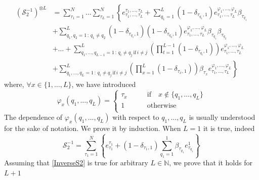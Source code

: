 \documentclass[11pt]{article}
\numberwithin{equation}{section}
\numberwithin{equation}{subsection}
\begin{document}
    \begin{equation}\label{InverseS2}
    	\begin{split}
    		\left(\mathcal{S}_{2}^{-1}\right)^{\otimes L}&=\sum_{\tau_{1}=1}^{N}\ldots\sum_{\tau_{L}=1}^{N}\left\{e_{\tau_{1},\ldots,\tau_{L}}^{\tau_{1},\ldots,\tau_{L}}+\sum_{q_{1}=1}^{L}(1-\delta_{\tau_{q_{1}},1})e_{\tau_{1},\ldots,\tau_{L}}^{\varphi_{1},\ldots,\varphi_{L}}\beta_{\tau_{q_{1}}}\right. 
    		\\&+\left. \sum_{q_{1},q_{2}=1\,:\,q_{1}\neq q_{2}}^{L}(1-\delta_{\tau_{q_{1}},1})(1-\delta_{\tau_{q_{2}},1})e^{\varphi_{1},\ldots,\varphi_{L}}_{\tau_{1},\ldots,\tau_{L}}\beta_{\tau_{q_{1}}}\beta_{\tau_{q_{2}}}\right.
    		\\&+\left.
    		\ldots+	\sum_{q_{1},\ldots,q_{L-1}=1\,:\,q_{i}\neq q_{j}\,\text{if}\,i\neq j}^{L}\left(\prod_{t=1}^{L-1}(1-\delta_{\tau_{q_{t}},1})\right)e_{\tau_{1},\ldots,\tau_{L}}^{\varphi_{1},\ldots,\varphi_{L}}
    		\right. \\&+ \left. 
    		\sum_{q_{1},\ldots,q_{L}=1\,:\,q_{i}\neq q_{j}\,\text{if}\,i\neq j}^{L}\left(\prod_{x=1}^{L}(1-\delta_{\tau_{x},1})\right)\beta_{\tau_{x}}e_{\tau_{1},\ldots,\tau_{L}}^{\varphi_{1},\ldots,\varphi_{L}} \right\}
    	\end{split}
    \end{equation}
where, $\forall x\in\{1,\ldots,L\}$, we have introduced
\begin{equation}
	\varphi_{x}(q_{1},\ldots,q_{L})=\begin{cases}
		\tau_{x}\qquad &\text{if}\quad x\notin\{q_{1},\ldots,q_{L}\}\\
		1\qquad &\text{otherwise}\\
	\end{cases}
\end{equation}
The dependence of $\varphi_{x}(q_{1},\ldots,q_{L})$ with respect to $q_{1},\ldots,q_{L}$ is usually understood for the sake of notation.
    We prove it by induction. When $L=1$ it is true, indeed
    \begin{equation}
    	\mathcal{S}_{2}^{-1}=\sum_{\tau_{1}=1}^{N}\left\{e_{\tau_{1}}^{\tau_{1}}+(1-\delta_{\tau_{1},1})\sum_{q_{1}=1}^{1}\beta_{\tau_{q_{1}}}e_{\tau_{q_{1}}}^{1}\right\}
    \end{equation}
    Assuming that \eqref{InverseS2} is true for arbitrary $L\in \mathbb{N}$, we prove that it holds for $L+1$
\end{document}
